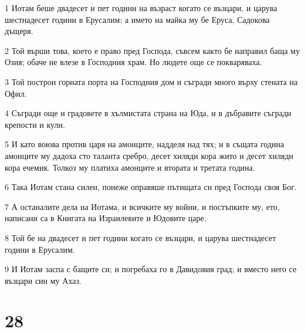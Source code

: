 \par 1 Иотам беше двадесет и пет години на възраст когато се възцари, и царува шестнадесет години в Ерусалим; а името на майка му бе Еруса, Садокова дъщеря.
\par 2 Той върши това, което е право пред Господа, съвсем както бе направил баща му Озия; обаче не влезе в Господния храм. Но людете още се покваряваха.
\par 3 Той построи горната порта на Господния дом и съгради много върху стената на Офил.
\par 4 Съгради още и градовете в хълмистата страна на Юда, и в дъбравите съгради крепости и кули.
\par 5 И като воюва против царя на амонците, надделя над тях; и в същата година амонците му дадоха сто таланта сребро, десет хиляди кора жито и десет хиляди кора ечемик. Толкоз му платиха амонците и втората и третата година.
\par 6 Така Иотам стана силен, понеже оправяше пътищата си пред Господа своя Бог.
\par 7 А останалите дела на Иотама, и всичките му войни, и постъпките му, ето, написани са в Книгата на Израилевите и Юдовите царе.
\par 8 Той бе на двадесет и пет години когато се възцари, и царува шестнадесет години в Ерусалим.
\par 9 И Иотам заспа с бащите си; и погребаха го в Давидовия град; и вместо него се възцари син му Ахаз.

\chapter{28}

